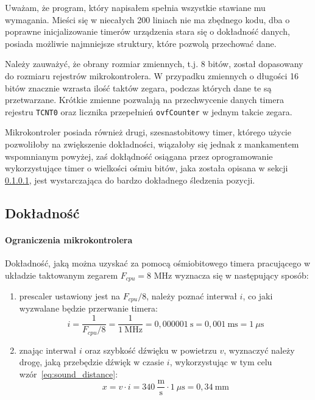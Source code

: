 Uważam, że program, który napisałem spełnia wszystkie stawiane mu wymagania. Mieści się w niecałych 200 liniach \ppauza nie ma zbędnego kodu, dba o poprawne inicjalizowanie timerów urządzenia \ppauza stara się o dokładność danych, posiada możliwie najmniejsze struktury, które pozwolą przechować dane.

Należy zauważyć, że obrany rozmiar zmiennych, t.j. 8 bitów, został dopasowany do rozmiaru rejestrów mikrokontrolera. W przypadku zmiennych o długości 16 bitów znacznie wzrasta ilość taktów zegara, podczas których dane te są przetwarzane. Krótkie zmienne pozwalają na przechwycenie danych timera \ppauza rejestru \texttt{TCNT0} oraz licznika przepełnień \texttt{ovfCounter} \ppauza w jednym takcie zegara.

Mikrokontroler posiada również drugi, szesnastobitowy timer, którego użycie pozwoliłoby na zwiększenie dokładności, wiązałoby się jednak z mankamentem wspomnianym powyżej, zaś dokłądność osiągana przez oprogramowanie wykorzystujące timer o wielkości ośmiu bitów, jaka została opisana w sekcji \ref{section:microcontroller_limit}, jest wystarczająca do bardzo dokładnego śledzenia pozycji.

\subsection{Dokładność}\label{section:precision}
\paragraph{Ograniczenia mikrokontrolera}
\label{section:microcontroller_limit}

Dokładność, jaką można uzyskać za pomocą ośmiobitowego timera pracującego w układzie taktowanym zegarem $F_{cpu} = 8$ MHz wyznacza się w następujący sposób:
\begin{enumerate}
 \item {}prescaler ustawiony jest na $F_{cpu}/8$, należy poznać interwał $i$, co jaki wyzwalane będzie przerwanie timera:
    \begin{equation}
      i = \frac{1}{F_{cpu}/8} = \frac{1}{1~\textrm{MHz}} = 0,000001~\textrm{s} = 0,001~\textrm{ms} = 1~\mu\textrm{s}
      \label{eq:sampling_frequency}
    \end{equation}

 \item znając interwał $i$ oraz szybkość dźwięku w powietrzu $v$, wyznaczyć należy drogę, jaką przebędzie dźwięk w czasie $i$, wykorzystując w tym celu wzór~\ref{eq:sound_distance}:
    \begin{equation}
      x = v \cdot i = 340~\frac{\textrm{m}}{\textrm{s}} \cdot 1~\mu\textrm{s} = 0,34~\textrm{mm}
      \label{eq:microcontroller_limit}
    \end{equation}
\end{enumerate}

